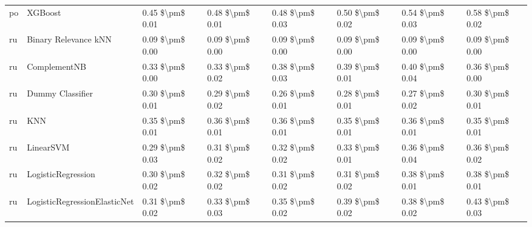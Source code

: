 \begin{tabular}{llllllll}
      po &                         XGBoost & 0.45 \$\textbackslash pm\$ 0.01 &           0.48 \$\textbackslash pm\$ 0.01 &       0.48 \$\textbackslash pm\$ 0.03 &        0.50 \$\textbackslash pm\$ 0.02 &                         0.54 \$\textbackslash pm\$ 0.03 &     0.58 \$\textbackslash pm\$ 0.02 \\
      ru &            Binary Relevance kNN & 0.09 \$\textbackslash pm\$ 0.00 &           0.09 \$\textbackslash pm\$ 0.00 &       0.09 \$\textbackslash pm\$ 0.00 &        0.09 \$\textbackslash pm\$ 0.00 &                         0.09 \$\textbackslash pm\$ 0.00 &     0.09 \$\textbackslash pm\$ 0.00 \\
      ru &                    ComplementNB & 0.33 \$\textbackslash pm\$ 0.00 &           0.33 \$\textbackslash pm\$ 0.02 &       0.38 \$\textbackslash pm\$ 0.03 &        0.39 \$\textbackslash pm\$ 0.01 &                         0.40 \$\textbackslash pm\$ 0.04 &     0.36 \$\textbackslash pm\$ 0.00 \\
      ru &                Dummy Classifier & 0.30 \$\textbackslash pm\$ 0.01 &           0.29 \$\textbackslash pm\$ 0.02 &       0.26 \$\textbackslash pm\$ 0.01 &        0.28 \$\textbackslash pm\$ 0.01 &                         0.27 \$\textbackslash pm\$ 0.02 &     0.30 \$\textbackslash pm\$ 0.01 \\
      ru &                             KNN & 0.35 \$\textbackslash pm\$ 0.01 &           0.36 \$\textbackslash pm\$ 0.01 &       0.36 \$\textbackslash pm\$ 0.01 &        0.35 \$\textbackslash pm\$ 0.01 &                         0.36 \$\textbackslash pm\$ 0.01 &     0.35 \$\textbackslash pm\$ 0.01 \\
      ru &                       LinearSVM & 0.29 \$\textbackslash pm\$ 0.03 &           0.31 \$\textbackslash pm\$ 0.02 &       0.32 \$\textbackslash pm\$ 0.02 &        0.33 \$\textbackslash pm\$ 0.01 &                         0.36 \$\textbackslash pm\$ 0.04 &     0.36 \$\textbackslash pm\$ 0.02 \\
      ru &              LogisticRegression & 0.30 \$\textbackslash pm\$ 0.02 &           0.32 \$\textbackslash pm\$ 0.02 &       0.31 \$\textbackslash pm\$ 0.02 &        0.31 \$\textbackslash pm\$ 0.02 &                         0.38 \$\textbackslash pm\$ 0.01 &     0.38 \$\textbackslash pm\$ 0.01 \\
      ru &    LogisticRegressionElasticNet & 0.31 \$\textbackslash pm\$ 0.02 &           0.33 \$\textbackslash pm\$ 0.03 &       0.35 \$\textbackslash pm\$ 0.02 &        0.39 \$\textbackslash pm\$ 0.02 &                         0.38 \$\textbackslash pm\$ 0.02 &     0.43 \$\textbackslash pm\$ 0.03 \\

\end{tabular}
